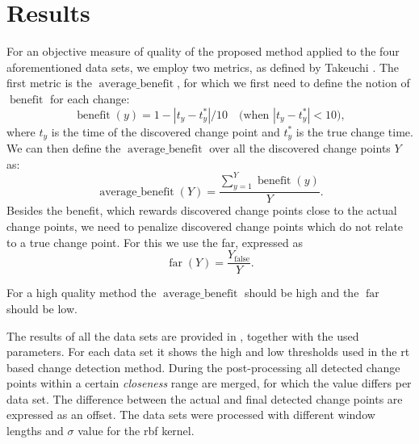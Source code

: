 \section{Results}\label{sec:artificial_data_results}
For an objective measure of quality of the proposed method applied to the four aforementioned data sets, we employ two metrics, as defined by Takeuchi \etal \cite{takeuchi2006unifying}.
The first metric is the $\operatorname*{average \_ benefit}$, for which we first need to define the notion of $\operatorname*{benefit}$ for each change:
\begin{equation}\label{eq:benefit}
  \operatorname*{benefit}(y) = 1 - |t_y - t_y^*| / 10  \mbox{~~~(when } |t_y - t_y^*| < 10 \mbox{)},
\end{equation}
where $t_y$ is the time of the discovered change point and $t_y^*$ is the true change time.
We can then define the $\operatorname*{average \_ benefit}$ over all the discovered change points $Y$ as:
\begin{equation}\label{eq:average_benefit}
  \operatorname*{average \_ benefit}(Y) = \frac{\sum_{y=1}^Y \operatorname*{benefit}(y)}{Y}.
\end{equation}
Besides the benefit, which rewards discovered change points close to the actual change points, we need to penalize discovered change points which do not relate to a true change point.
For this we use the \acrlong{far}, expressed as
\begin{equation}\label{eq:false_alarm_rate}
  \operatorname*{far}(Y) = \frac{Y_{\operatorname*{false}}}{Y}.
\end{equation}

For a high quality method the $\operatorname*{average\_benefit}$ should be high and the $\operatorname*{far}$ should be low.


The results of all the data sets are provided in , together with the used parameters.
For each data set it shows the high and low thresholds used in the \gls{rt} based change detection method.
During the post-processing all detected change points within a certain \emph{closeness} range are merged, for which the value differs per data set.
The difference between the actual and final detected change points are expressed as an offset.
The data sets were processed with different window lengths and $\sigma$ value for the \gls{rbf} kernel.

